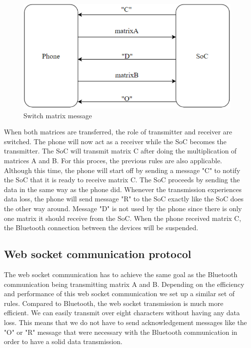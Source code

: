 \documentclass[a4paper, 11pt]{report}
\begin{document}
\begin{figure}[ht]
\centering
\includegraphics[scale=0.7]{images/ShiftMatrix.pdf}
\caption{Switch matrix message}\label{fig:shiftMatrix}
\end{figure}

When both matrices are transferred, the role of transmitter and receiver are switched. The phone will now act as a receiver while the SoC becomes the transmitter. The SoC will transmit matrix C after doing the multiplication of matrices A and B. For this proces, the previous rules are also applicable. Although this time, the phone will start off by sending a message "C" to notify the SoC that it is ready to receive matrix C. The SoC proceeds by sending the data in the same way as the phone did. Whenever the transmission experiences data loss, the phone will send message "R" to the SoC exactly like the SoC does the other way around.
Message "D" is not used by the phone since there is only one matrix it should receive from the SoC. When the phone received matrix C, the Bluetooth connection between the devices will be suspended.

	\subsection{Web socket communication protocol}\label{subsec:websocketProtocol}
The web socket communication has to achieve the same goal as the Bluetooth communication being transmitting matrix A and B. Depending on the efficiency and performance of this web socket communication we set up a similar set of rules. Compared to Bluetooth, the web socket transmission is much more efficient. We can easily transmit over eight characters without having any data loss. This means that we do not have to send acknowledgement messages like the "O" or "R" message that were necessary with the Bluetooth communication in order to have a solid data transmission.
\end{document}
